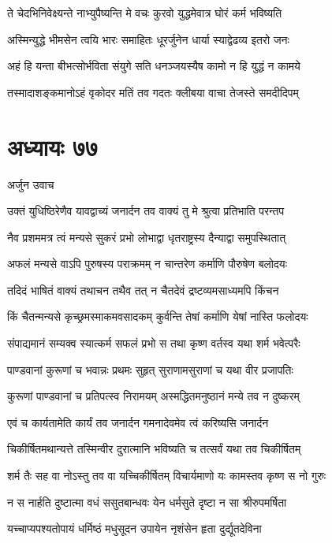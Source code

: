 \twolineshloka
{ते चेदभिनिवेक्ष्यन्ते नाभ्युपैष्यन्ति मे वचः}
{कुरवो युद्धमेवात्र घोरं कर्म भविष्यति}


\twolineshloka
{अस्मिन्युद्धे भीमसेन त्वयि भारः समाहितः}
{धूरर्जुनेन धार्या स्याद्वेढव्य इतरो जनः}


\twolineshloka
{अहं हि यन्ता बीभत्सोर्भविता संयुगे सति}
{धनञ्जयस्यैष कामो न हि युद्धं न कामये}


\twolineshloka
{तस्मादाशङ्कमानोऽहं वृकोदर मतिं तव}
{गदतः क्लीबया वाचा तेजस्ते समदीदिपम्}


\chapter{अध्यायः ७७}
\twolineshloka
{अर्जुन उवाच}
{}


\twolineshloka
{उक्तं युधिष्ठिरेणैव यावद्वाच्यं जनार्दन}
{तव वाक्यं तु मे श्रुत्वा प्रतिभाति परन्तप}


\twolineshloka
{नैव प्रशममत्र त्वं मन्यसे सुकरं प्रभो}
{लोभाद्वा धृतराष्ट्रस्य दैन्याद्वा समुपस्थितात्}


\twolineshloka
{अफलं मन्यसे वाऽपि पुरुषस्य पराक्रमम्}
{न चान्तरेण कर्माणि पौरुषेण बलोदयः}


\twolineshloka
{तदिदं भाषितं वाक्यं तथाचन तथैव तत्}
{न चैतदेवं द्रष्टव्यमसाध्यमपि किंचन}


\twolineshloka
{किं चैतन्मन्यसे कृच्छ्रमस्माकमवसादकम्}
{कुर्वन्ति तेषां कर्माणि येषां नास्ति फलोदयः}


\twolineshloka
{संपाद्यमानं सम्यक्व स्यात्कर्म सफलं प्रभो}
{स तथा कृष्ण वर्तस्व यथा शर्म भवेत्परैः}


\twolineshloka
{पाण्डवानां कुरूणां च भवान्नः प्रथमः सुहृत्}
{सुराणामसुराणां च यथा वीर प्रजापतिः}


\twolineshloka
{कुरूणां पाण्डवानां च प्रतिपत्स्व निरामयम्}
{अस्मद्धितमनुष्ठानं मन्ये तव न दुष्करम्}


\twolineshloka
{एवं च कार्यतामेति कार्यं तव जनार्दन}
{गमनादेवमेव त्वं करिष्यसि जनार्दन}


\twolineshloka
{चिकीर्षितमथान्यत्ते तस्मिन्वीर दुरात्मानि}
{भविष्यति च तत्सर्वं यथा तव चिकीर्षितम्}


\twolineshloka
{शर्म तैः सह वा नोऽस्तु तव वा यच्चिकीर्षितम्}
{विचार्यमाणो यः कामस्तव कृष्ण स नो गुरुः}


\twolineshloka
{न स नार्हति दुष्टात्मा वधं ससुतबान्धवः}
{येन धर्मसुते दृष्टा न सा श्रीरुपमर्षिता}


\twolineshloka
{यच्चाप्यपश्यतोपायं धर्मिष्ठं मधुसूदन}
{उपायेन नृशंसेन हृता दुर्द्यूतदेविना}


